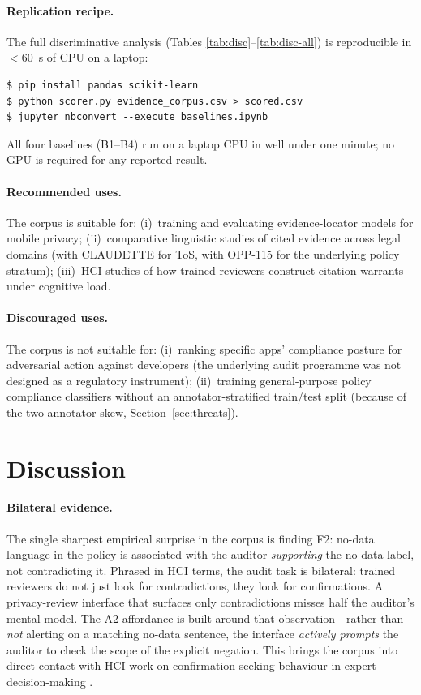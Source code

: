 \documentclass[11pt,a4paper]{article}
\begin{document}
\paragraph{Replication recipe.}
The full discriminative analysis (Tables
\ref{tab:disc}--\ref{tab:disc-all}) is reproducible in
$<60$~s of CPU on a laptop:
{\small
\begin{verbatim}
$ pip install pandas scikit-learn
$ python scorer.py evidence_corpus.csv > scored.csv
$ jupyter nbconvert --execute baselines.ipynb
\end{verbatim}}
All four baselines (B1--B4) run on a laptop CPU
in well under one minute; no GPU is required for any reported
result.

\paragraph{Recommended uses.}
The corpus is suitable for:
(i)~training and evaluating evidence-locator models for mobile
privacy;
(ii)~comparative linguistic studies of cited evidence across legal
domains (with CLAUDETTE for ToS, with OPP-115 for the underlying
policy stratum);
(iii)~HCI studies of how trained reviewers construct citation
warrants under cognitive load.

\paragraph{Discouraged uses.}
The corpus is not suitable for:
(i)~ranking specific apps' compliance posture for adversarial action
against developers (the underlying audit programme was not designed as
a regulatory instrument);
(ii)~training general-purpose policy compliance classifiers without an
annotator-stratified train/test split (because of the two-annotator
skew, Section~\ref{sec:threats}).

\section{Discussion}\label{sec:discussion}
\paragraph{Bilateral evidence.}
The single sharpest empirical surprise in the corpus is finding F2:
no-data language in the policy is associated with the auditor
\emph{supporting} the no-data label, not contradicting it. Phrased in
HCI terms, the audit task is bilateral: trained reviewers do not just
look for contradictions, they look for confirmations. A privacy-review
interface that surfaces only contradictions misses half the auditor's
mental model. The A2 affordance is built around that
observation---rather than \emph{not} alerting on a matching no-data
sentence, the interface \emph{actively prompts} the auditor to check
the scope of the explicit negation. This brings the corpus into
direct contact with HCI work on confirmation-seeking behaviour in
expert decision-making
\citep{liao2020questioning,bansal2021does,cai2019hello}.
\end{document}
